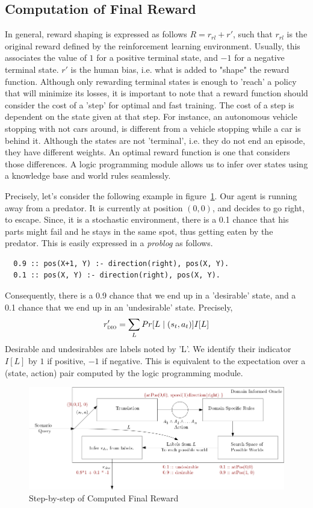 \subsection{Computation of Final Reward}
\label{sec:comreward}
In general, reward shaping is expressed as follows
  $R = r_{rl} + r'$, 
such that $r_{rl}$ is the original reward defined by the reinforcement learning environment. Usually, this associates the value of $1$ for a positive terminal state, 
and $-1$ for a negative terminal state. $r'$ is the human bias, i.e. what is added to "shape" the reward function. 
Although only rewarding terminal states is enough to 'reach' a policy that will minimize its losses, it is important to note that a reward function should consider the cost of a 'step' 
for optimal and fast training. The cost of a step is dependent on the state given at that step. For instance, an autonomous vehicle stopping with not cars around, is different from a vehicle 
stopping while a car is behind it. Although the states are not 'terminal', i.e. they do not end an episode, they have different weights. 
An optimal reward function is one that considers those differences. A logic programming module allows us to infer over states using a knowledge base and world rules seamlessly. 

Precisely, let's consider the following example in figure~\ref{fig:diospecs}.
Our agent is running away from a predator. It is currently at position $(0,0)$, and decides to go right, to escape. 
Since, it is a stochastic environment, there is a 0.1 chance that his parts might fail and he stays in the same spot, thus getting eaten by the predator. 
This is easily expressed in a \emph{problog} as follows. 
\begin{verbatim}
  0.9 :: pos(X+1, Y) :- direction(right), pos(X, Y). 
  0.1 :: pos(X, Y) :- direction(right), pos(X, Y). 
\end{verbatim}
Consequently, there is a 0.9 chance that we end up in a 'desirable' state, and a 0.1 chance that we end up in an 'undesirable' state. Precisely, 
\[ 
   r'_{\textsc{dio}{}} = \sum_{L} Pr[L \mid (s_t, a_t)] I[L]
\] 
Desirable and undesirables are labels noted by 'L'. We identify their indicator $I[L]$ by $1$ if positive, $-1$ if negative.
This is equivalent to the expectation over a (state, action) pair computed by the logic programming module. 
\begin{figure}
  \centering
  \includegraphics[scale=0.45]{figures/diospecs.png}
  \caption{Step-by-step of Computed Final Reward}
  \label{fig:diospecs}
\end{figure}

